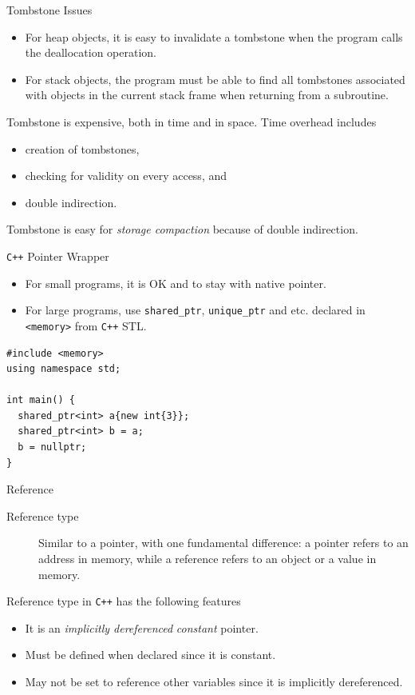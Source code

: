 \documentclass[presentation]{beamer}
\begin{document}
\begin{frame}[label={sec:orgheadline55}]{Tombstone Issues}
\begin{itemize}
\item For heap objects, it is easy to invalidate a tombstone when the
program calls the deallocation operation.
\item For stack objects, the program must be able to find all
tombstones associated with objects in the current stack frame
when returning from a subroutine.
\end{itemize}

Tombstone is expensive, both in time and in space.  Time overhead
includes
\begin{itemize}
\item creation of tombstones,
\item checking for validity on every access, and
\item double indirection.
\end{itemize}


Tombstone is easy for \emph{storage compaction} because of double
indirection.
\end{frame}

\begin{frame}[fragile,label={sec:orgheadline56}]{\texttt{C++} Pointer Wrapper}
 \begin{itemize}
\item For small programs, it is OK and to stay with native pointer.
\item For large programs, use \texttt{shared\_ptr}, \texttt{unique\_ptr} and
etc. declared in \texttt{<memory>} from \texttt{C++} STL.
\end{itemize}


\begin{verbatim}
#include <memory>
using namespace std;

int main() {
  shared_ptr<int> a{new int{3}};
  shared_ptr<int> b = a;
  b = nullptr;
}
\end{verbatim}
\end{frame}

\begin{frame}[fragile,label={sec:orgheadline57}]{Reference}
 \begin{description}
\item[{Reference type}] Similar to a pointer, with one fundamental
difference: a pointer refers to an address in memory, while a
reference refers to an object or a value in memory.
\end{description}


Reference type in \texttt{C++} has the following features
\begin{itemize}
\item It is an \emph{implicitly dereferenced} \emph{constant} pointer.
\item Must be defined when declared since it is constant.
\item May not be set to reference other variables since it is
implicitly dereferenced.
\end{itemize}
\end{frame}
\end{document}
